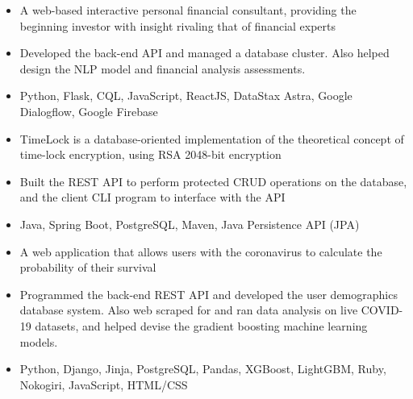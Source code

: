 \documentclass[11pt,letterpaper]{article}
\begin{document}
    \begin{itemize}
      \item{A web-based interactive personal financial consultant, providing the beginning investor with insight rivaling that of financial experts}
      \item{Developed the back-end API and managed a database cluster. Also helped design the NLP model and financial analysis assessments.}
      \item{
        {}
        Python, Flask, CQL, JavaScript, ReactJS, DataStax Astra, Google Dialogflow, Google Firebase
      }
    \end{itemize}
  \fi

  \iftimelock
    {\fontsize{12}{12}}

    \begin{itemize}
      \item{TimeLock is a database-oriented implementation of the theoretical concept of time-lock encryption, using RSA 2048-bit encryption}

      \item{Built the REST API to perform protected CRUD operations on the database, and the client CLI program to interface with the API}

      \item{
        {}
        Java, Spring Boot, PostgreSQL, Maven, Java Persistence API (JPA)
      }
    \end{itemize}
  \fi

  \ifcovidsurvivalcalculator
    {\fontsize{12}{12}}

    \begin{itemize}
      \item{A web application that allows users with the coronavirus to calculate the probability of their survival}

      \item{Programmed the back-end REST API and developed the user demographics database system. Also web scraped for and ran data analysis on live COVID-19 datasets, and helped devise the gradient boosting machine learning models.}

      \item{
        {}
        Python, Django, Jinja, PostgreSQL, Pandas, XGBoost, LightGBM, Ruby, Nokogiri, JavaScript, HTML/CSS
      }
    \end{itemize}
  \fi
\end{document}
